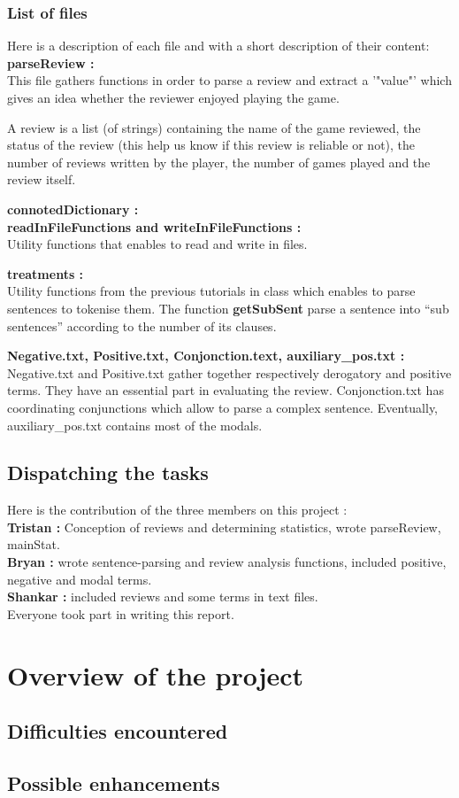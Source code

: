 \documentclass[paper=a4,fontsize=12pt]{report}
\begin{document}
\subsection{List of files}
	Here is a description of each file and with a short description of their content:\\

\textbf{parseReview :} \\
This file gathers functions in order to parse a review and extract a '"value"' which gives an idea whether the reviewer enjoyed playing the game.

A review is a list (of strings) containing  the name of the game reviewed, the status of the review (this help us know if this review is reliable or not), the number of reviews written by the player, the number of games played and the review itself. 

\textbf{connotedDictionary :} \\

\textbf{readInFileFunctions and writeInFileFunctions :} \\
Utility functions that enables to read and write in files. 

\textbf{treatments :} \\  
Utility functions from the previous tutorials in class which enables to parse sentences to tokenise them. The function \textbf{getSubSent} parse a sentence into "`sub sentences"' according to the number of its clauses.

\textbf{Negative.txt, Positive.txt, Conjonction.text, auxiliary\_pos.txt :} \\
Negative.txt and Positive.txt gather together respectively derogatory and positive terms. They have an essential part in evaluating the review. Conjonction.txt has coordinating conjunctions which allow to parse a complex sentence. Eventually, auxiliary\_pos.txt contains most of the modals. 

\section{Dispatching the tasks}
	Here is the contribution of the three members on this project :
\\
\textbf{Tristan : } Conception of reviews and determining statistics, wrote parseReview, mainStat.
\\
\textbf{Bryan : } wrote sentence-parsing and review analysis functions, included positive, negative and modal terms.
\\
\textbf{Shankar : } included reviews and some terms in text files.
\\
Everyone took part in writing this report.

\chapter{Overview of the project}
\section{Difficulties encountered}
\section{Possible enhancements}
\end{document}
